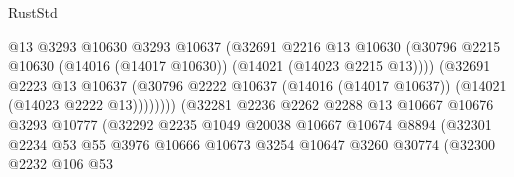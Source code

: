 \begin{lexlean}{RustStd}
\begin{coremodule}
                                          @13
                                          @3293
                                          @10630
                                          @3293
                                          @10637
                                          (@32691
                                            @2216
                                            @13
                                            @10630
                                            (@30796
                                              @2215
                                              @10630
                                              (@14016 (@14017 @10630))
                                              (@14021 (@14023 @2215 @13))))
                                          (@32691
                                            @2223
                                            @13
                                            @10637
                                            (@30796
                                              @2222
                                              @10637
                                              (@14016 (@14017 @10637))
                                              (@14021 (@14023 @2222 @13))))))))
                                  (@32281
                                    @2236
                                    @2262
                                    @2288
                                    @13
                                    @10667
                                    @10676
                                    @3293
                                    @10777
                                    (@32292
                                      @2235
                                      @1049
                                      @20038
                                      @10667
                                      @10674
                                      @8894
                                      (@32301
                                        @2234
                                        @53
                                        @55
                                        @3976
                                        @10666
                                        @10673
                                        @3254
                                        @10647
                                        @3260
                                        @30774
                                        (@32300
                                          @2232
                                          @106
                                          @53

\end{coremodule}
\end{lexlean}
